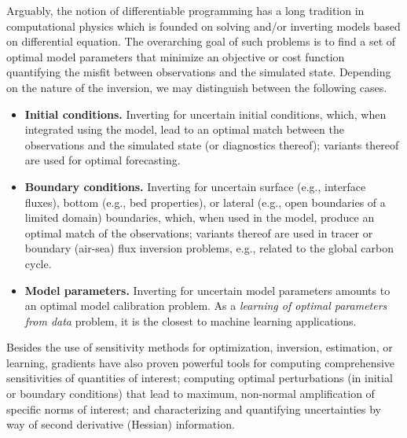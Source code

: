 Arguably, the notion of differentiable programming has a long tradition in computational physics which is founded on solving and/or inverting models based on differential equation.
The overarching goal of such problems is to find a set of optimal model parameters that minimize an objective or cost function quantifying the misfit between observations and the simulated state.
Depending on the nature of the inversion, we may distinguish between the following cases.
\begin{itemize}
    \item \textbf{Initial conditions.} Inverting for uncertain initial conditions, which, when integrated using the model, lead to an optimal match between the observations and the simulated state (or diagnostics thereof); variants thereof are used for optimal forecasting.
    \item \textbf{Boundary conditions.} Inverting for uncertain surface (e.g., interface fluxes), bottom (e.g., bed properties), or lateral (e.g., open boundaries of a limited domain) boundaries, which, when used in the model, produce an optimal match of the observations; variants thereof are used in tracer or boundary (air-sea) flux inversion problems, e.g., related to the global carbon cycle.
    \item \textbf{Model parameters.} Inverting for uncertain model parameters amounts to an optimal model calibration problem. As a \textit{learning of optimal parameters from data} problem, it is the closest to machine learning applications.
\end{itemize}
Besides the use of sensitivity methods for optimization, inversion, estimation, or learning, gradients have also proven powerful tools for computing comprehensive sensitivities of quantities of interest; computing optimal perturbations (in initial or boundary conditions) that lead to maximum, non-normal amplification of specific norms of interest; and characterizing and quantifying uncertainties by way of second derivative (Hessian) information.

